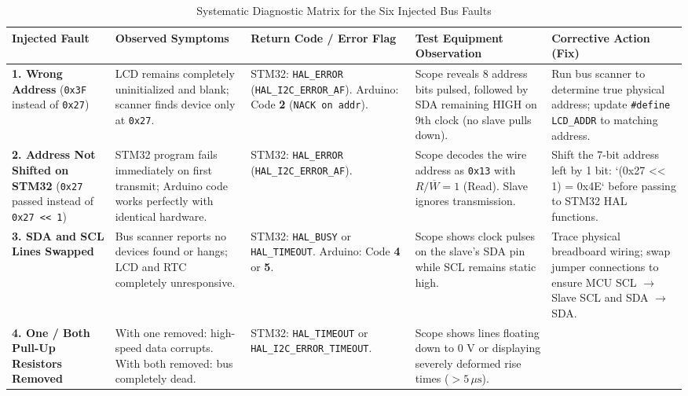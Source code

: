 \documentclass[11pt,a4paper]{article}
\begin{document}
\begin{table}[h!]
\centering
\scriptsize
\caption{Systematic Diagnostic Matrix for the Six Injected Bus Faults}
\vspace{4pt}
\begin{tabularx}{\textwidth}{p{2.3cm} p{2.5cm} p{2.2cm} p{2.6cm} X}
\toprule
\textbf{Injected Fault} & \textbf{Observed Symptoms} & \textbf{Return Code / Error Flag} & \textbf{Test Equipment Observation} & \textbf{Corrective Action (Fix)} \\
\midrule
\textbf{1. Wrong Address} \newline (\texttt{0x3F} instead of \texttt{0x27}) 
    & LCD remains completely uninitialized and blank; scanner finds device only at \texttt{0x27}. 
    & STM32: \texttt{HAL\_ERROR} (\texttt{HAL\_I2C\_ERROR\_AF}). \newline Arduino: Code \textbf{2} (\texttt{NACK on addr}). 
    & Scope reveals 8 address bits pulsed, followed by SDA remaining HIGH on 9th clock (no slave pulls down). 
    & Run bus scanner to determine true physical address; update \texttt{\#define LCD\_ADDR} to matching address. \\
\midrule
\textbf{2. Address Not Shifted on STM32} \newline (\texttt{0x27} passed instead of \texttt{0x27 << 1}) 
    & STM32 program fails immediately on first transmit; Arduino code works perfectly with identical hardware. 
    & STM32: \texttt{HAL\_ERROR} (\texttt{HAL\_I2C\_ERROR\_AF}). 
    & Scope decodes the wire address as \texttt{0x13} with $R/\overline{W}=1$ (Read). Slave ignores transmission. 
    & Shift the 7-bit address left by 1 bit: `(0x27 << 1) = 0x4E` before passing to STM32 HAL functions. \\
\midrule
\textbf{3. SDA and SCL Lines Swapped} 
    & Bus scanner reports no devices found or hangs; LCD and RTC completely unresponsive. 
    & STM32: \texttt{HAL\_BUSY} or \texttt{HAL\_TIMEOUT}. \newline Arduino: Code \textbf{4} or \textbf{5}. 
    & Scope shows clock pulses on the slave's SDA pin while SCL remains static high. 
    & Trace physical breadboard wiring; swap jumper connections to ensure MCU SCL $\to$ Slave SCL and SDA $\to$ SDA. \\
\midrule
\textbf{4. One / Both Pull-Up Resistors Removed} 
    & With one removed: high-speed data corrupts. With both removed: bus completely dead. 
    & STM32: \texttt{HAL\_TIMEOUT} or \texttt{HAL\_I2C\_ERROR\_TIMEOUT}. 
    & Scope shows lines floating down to $0\text{ V}$ or displaying severely deformed rise times ($> 5\,\mu\text{s}$). 

\end{tabularx}
\end{table}
\end{document}
